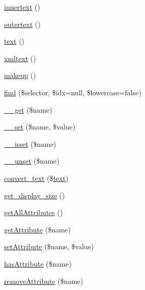 \begin{DoxyCompactItemize}
\item 
\hyperlink{classsimple__html__dom__node_a3791d55e93a3af992d58a3db23abab9b}{innertext} ()
\item 
\hyperlink{classsimple__html__dom__node_a64d25961093a3b4c7b9b26a6d56c5831}{outertext} ()
\item 
\hyperlink{classsimple__html__dom__node_a37df362c2f77a0045fa8af094f432238}{text} ()
\item 
\hyperlink{classsimple__html__dom__node_aaca21e3e742f813c78857a91f389fa66}{xmltext} ()
\item 
\hyperlink{classsimple__html__dom__node_a6023a015b0fefd6a3b2ad737bf7fd133}{makeup} ()
\item 
\hyperlink{classsimple__html__dom__node_afbf375e355aa32c25f7e389a04ddced0}{find} (\$selector, \$idx=null, \$lowercase=false)
\item 
\hyperlink{classsimple__html__dom__node_abc8e9e31bb15c8a44c3210ec551407c8}{\+\_\+\+\_\+get} (\$name)
\item 
\hyperlink{classsimple__html__dom__node_a83c2703c91959192f759992ad5640b67}{\+\_\+\+\_\+set} (\$name, \$value)
\item 
\hyperlink{classsimple__html__dom__node_a8f132f051b7cd7d570ccb9f6e2bb4201}{\+\_\+\+\_\+isset} (\$name)
\item 
\hyperlink{classsimple__html__dom__node_a8a93654c7bfe3f0a9bb7af531e513d44}{\+\_\+\+\_\+unset} (\$name)
\item 
\hyperlink{classsimple__html__dom__node_a23887642cd0616d2eed24d7c39c821fc}{convert\+\_\+text} (\$\hyperlink{classsimple__html__dom__node_a37df362c2f77a0045fa8af094f432238}{text})
\item 
\hyperlink{classsimple__html__dom__node_a29f9eadb33488a28542a01215970faca}{get\+\_\+display\+\_\+size} ()
\item 
\hyperlink{classsimple__html__dom__node_a87ba362b0d72b64e0da6f095c5c40ba5}{get\+All\+Attributes} ()
\item 
\hyperlink{classsimple__html__dom__node_ae954da422d40fc286691e54679e44c6f}{get\+Attribute} (\$name)
\item 
\hyperlink{classsimple__html__dom__node_a545f43e4d937e0e272a4bafe8b411d55}{set\+Attribute} (\$name, \$value)
\item 
\hyperlink{classsimple__html__dom__node_ac78ba27a41d0291c61326022489d4986}{has\+Attribute} (\$name)
\item 
\hyperlink{classsimple__html__dom__node_abbf04707cf678979459a4438e1450876}{remove\+Attribute} (\$name)
\item 

\end{DoxyCompactItemize}
